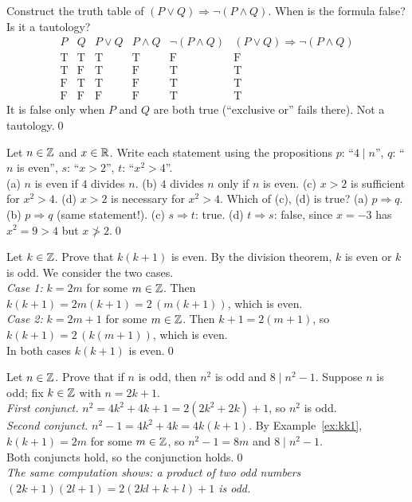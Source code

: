 \begin{hexample}
Construct the truth table of $(P\vee Q)\Rightarrow\neg(P\wedge Q)$. When is the formula false? Is it a tautology?
\solution
\[
\begin{array}{cc|ccc|c}
P&Q&P\vee Q&P\wedge Q&\neg(P\wedge Q)&(P\vee Q)\Rightarrow\neg(P\wedge Q)\\\hline
\mathrm T&\mathrm T&\mathrm T&\mathrm T&\mathrm F&\mathrm F\\
\mathrm T&\mathrm F&\mathrm T&\mathrm F&\mathrm T&\mathrm T\\
\mathrm F&\mathrm T&\mathrm T&\mathrm F&\mathrm T&\mathrm T\\
\mathrm F&\mathrm F&\mathrm F&\mathrm F&\mathrm T&\mathrm T
\end{array}
\]
It is false only when $P$ and $Q$ are both true (``exclusive or'' fails there). Not a tautology.\qed
\end{hexample}

\begin{hexample}
Let $n\in\mathbb{Z}$ and $x\in\mathbb{R}$. Write each statement using the propositions $p$: ``$4\mid n$'', $q$: ``$n$ is even'', $s$: ``$x>2$'', $t$: ``$x^2>4$''.\\
(a) $n$ is even if $4$ divides $n$. \quad (b) $4$ divides $n$ only if $n$ is even. \quad (c) $x>2$ is sufficient for $x^2>4$. \quad (d) $x>2$ is necessary for $x^2>4$. Which of (c), (d) is true?
\solution
(a) $p\Rightarrow q$. \quad (b) $p\Rightarrow q$ (same statement!). \quad (c) $s\Rightarrow t$: true. \quad (d) $t\Rightarrow s$: false, since $x=-3$ has $x^2=9>4$ but $x\not>2$.\qed
\end{hexample}

\begin{hexample}\label{ex:kk1}
Let $k\in\mathbb{Z}$. Prove that $k(k+1)$ is even.
\solution
By the division theorem, $k$ is even or $k$ is odd. We consider the two cases.\\
\emph{Case 1:} $k=2m$ for some $m\in\mathbb{Z}$. Then $k(k+1)=2m(k+1)=2\,(m(k+1))$, which is even.\\
\emph{Case 2:} $k=2m+1$ for some $m\in\mathbb{Z}$. Then $k+1=2(m+1)$, so $k(k+1)=2\,(k(m+1))$, which is even.\\
In both cases $k(k+1)$ is even.\qed
\end{hexample}

\begin{hexample}\label{ex:oddprod}
Let $n\in\mathbb{Z}$. Prove that if $n$ is odd, then $n^2$ is odd and $8\mid n^2-1$.
\solution
Suppose $n$ is odd; fix $k\in\mathbb{Z}$ with $n=2k+1$.\\
\emph{First conjunct.} $n^2=4k^2+4k+1=2(2k^2+2k)+1$, so $n^2$ is odd.\\
\emph{Second conjunct.} $n^2-1=4k^2+4k=4k(k+1)$. By Example~\ref{ex:kk1}, $k(k+1)=2m$ for some $m\in\mathbb{Z}$, so $n^2-1=8m$ and $8\mid n^2-1$.\\
Both conjuncts hold, so the conjunction holds.\qed\\[2pt]
\emph{The same computation shows: a product of two odd numbers $(2k+1)(2l+1)=2(2kl+k+l)+1$ is odd.}
\end{hexample}

